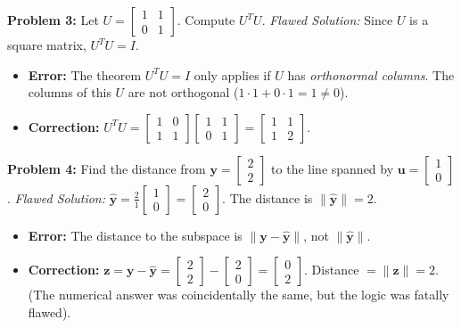 \documentclass[11pt, letterpaper]{article}
\theoremstyle{definition}
\theoremstyle{remark}
\begin{document}
\textbf{Problem 3:} Let $U = \begin{bmatrix} 1 & 1 \\ 0 & 1 \end{bmatrix}$. Compute $U^T U$.
\textit{Flawed Solution:} Since $U$ is a square matrix, $U^T U = I$.
\begin{itemize}
    \item \textbf{Error:} The theorem $U^T U = I$ only applies if $U$ has \textit{orthonormal columns}. The columns of this $U$ are not orthogonal ($1 \cdot 1 + 0 \cdot 1 = 1 \neq 0$).
    \item \textbf{Correction:} $U^T U = \begin{bmatrix} 1 & 0 \\ 1 & 1 \end{bmatrix} \begin{bmatrix} 1 & 1 \\ 0 & 1 \end{bmatrix} = \begin{bmatrix} 1 & 1 \\ 1 & 2 \end{bmatrix}$.
\end{itemize}

\textbf{Problem 4:} Find the distance from $\mathbf{y} = \begin{bmatrix} 2 \\ 2 \end{bmatrix}$ to the line spanned by $\mathbf{u} = \begin{bmatrix} 1 \\ 0 \end{bmatrix}$.
\textit{Flawed Solution:} $\hat{\mathbf{y}} = \frac{2}{1} \begin{bmatrix} 1 \\ 0 \end{bmatrix} = \begin{bmatrix} 2 \\ 0 \end{bmatrix}$. The distance is $\|\hat{\mathbf{y}}\| = 2$.
\begin{itemize}
    \item \textbf{Error:} The distance to the subspace is $\|\mathbf{y} - \hat{\mathbf{y}}\|$, not $\|\hat{\mathbf{y}}\|$.
    \item \textbf{Correction:} $\mathbf{z} = \mathbf{y} - \hat{\mathbf{y}} = \begin{bmatrix} 2 \\ 2 \end{bmatrix} - \begin{bmatrix} 2 \\ 0 \end{bmatrix} = \begin{bmatrix} 0 \\ 2 \end{bmatrix}$. Distance $= \|\mathbf{z}\| = 2$. (The numerical answer was coincidentally the same, but the logic was fatally flawed).
\end{itemize}
\end{document}
